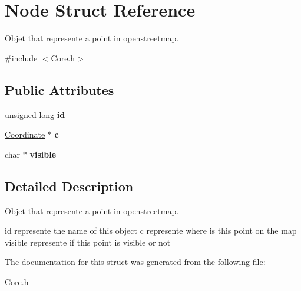 \hypertarget{structNode}{\section{Node Struct Reference}
\label{structNode}
}


Objet that represente a point in openstreetmap.  




{\ttfamily \#include $<$Core.\-h$>$}

\subsection*{Public Attributes}
\begin{DoxyCompactItemize}
\item 
\hypertarget{structNode_aa8fa6b7f98e29166dbccce4a7f09929c}{unsigned long {\bfseries id}}\label{structNode_aa8fa6b7f98e29166dbccce4a7f09929c}

\item 
\hypertarget{structNode_a26b699d982158ab6f00cff23b1e13d4b}{\hyperlink{structCoordinate}{Coordinate} $\ast$ {\bfseries c}}\label{structNode_a26b699d982158ab6f00cff23b1e13d4b}

\item 
\hypertarget{structNode_a028bca5291cb35567d02b8077a81efdb}{char $\ast$ {\bfseries visible}}\label{structNode_a028bca5291cb35567d02b8077a81efdb}

\end{DoxyCompactItemize}


\subsection{Detailed Description}
Objet that represente a point in openstreetmap. 

id represente the name of this object c represente where is this point on the map visible represente if this point is visible or not 

The documentation for this struct was generated from the following file\-:\begin{DoxyCompactItemize}
\item 
\hyperlink{Core_8h}{Core.\-h}\end{DoxyCompactItemize}
